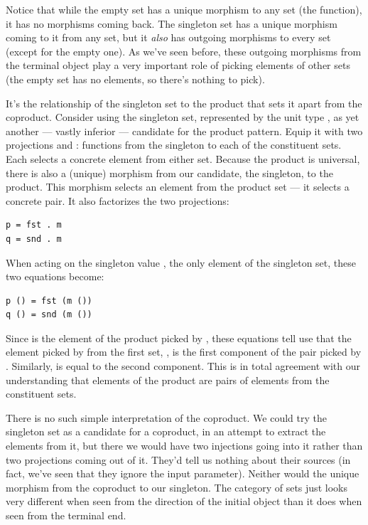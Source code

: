 Notice that while the empty set has a unique morphism to any set (the
 function), it has no morphisms coming back. The
singleton set has a unique morphism coming to it from any set, but it
\emph{also} has outgoing morphisms to every set (except for the empty
one). As we've seen before, these outgoing morphisms from the terminal
object play a very important role of picking elements of other sets (the
empty set has no elements, so there's nothing to pick).

It's the relationship of the singleton set to the product that sets it
apart from the coproduct. Consider using the singleton set, represented
by the unit type \code{()}, as yet another --- vastly inferior ---
candidate for the product pattern. Equip it with two projections
 and : functions from the singleton to each of the
constituent sets. Each selects a concrete element from either set.
Because the product is universal, there is also a (unique) morphism
 from our candidate, the singleton, to the product. This
morphism selects an element from the product set --- it selects a
concrete pair. It also factorizes the two projections:

\begin{verbatim}
p = fst . m
q = snd . m
\end{verbatim}

When acting on the singleton value \code{()}, the only element of the
singleton set, these two equations become:

\begin{verbatim}
p () = fst (m ())
q () = snd (m ())
\end{verbatim}

Since  is the element of the product picked by ,
these equations tell use that the element picked by  from the
first set, , is the first component of the pair picked by
. Similarly,  is equal to the second component.
This is in total agreement with our understanding that elements of the
product are pairs of elements from the constituent sets.

There is no such simple interpretation of the coproduct. We could try
the singleton set as a candidate for a coproduct, in an attempt to
extract the elements from it, but there we would have two injections
going into it rather than two projections coming out of it. They'd tell
us nothing about their sources (in fact, we've seen that they ignore the
input parameter). Neither would the unique morphism from the coproduct
to our singleton. The category of sets just looks very different when
seen from the direction of the initial object than it does when seen
from the terminal end.

